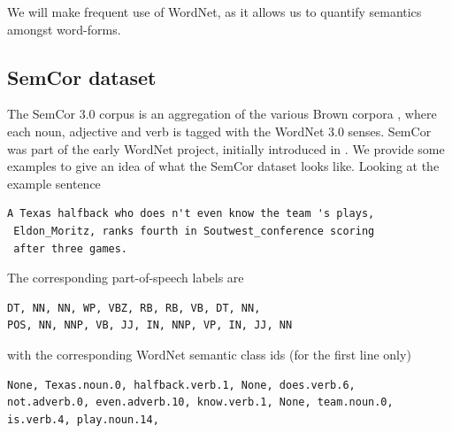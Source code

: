 \documentclass[a4paper,12pt,twoside,openright]{report}
\begin{document}
We will make frequent use of WordNet, as it allows us to quantify semantics amongst word-forms.

\subsection{SemCor dataset}

The SemCor 3.0 corpus is an aggregation of the various Brown corpora \cite{francis64}, where each noun, adjective and verb is tagged with the WordNet 3.0 senses.
SemCor was part of the early WordNet project, initially introduced in \cite{miller94}.
We provide some examples to give an idea of what the SemCor dataset looks like.
Looking at the example sentence

\begin{tcolorbox}
\begin{verbatim}
A Texas halfback who does n't even know the team 's plays,
 Eldon_Moritz, ranks fourth in Soutwest_conference scoring 
 after three games.
\end{verbatim}
\end{tcolorbox}

The corresponding part-of-speech labels are

\begin{tcolorbox}
\begin{verbatim}
DT, NN, NN, WP, VBZ, RB, RB, VB, DT, NN, 
POS, NN, NNP, VB, JJ, IN, NNP, VP, IN, JJ, NN
\end{verbatim}
\end{tcolorbox}

with the corresponding WordNet semantic class ids (for the first line only)

\begin{tcolorbox}
\begin{verbatim}
None, Texas.noun.0, halfback.verb.1, None, does.verb.6,
not.adverb.0, even.adverb.10, know.verb.1, None, team.noun.0,
is.verb.4, play.noun.14,
\end{verbatim}
\end{tcolorbox}
\end{document}
